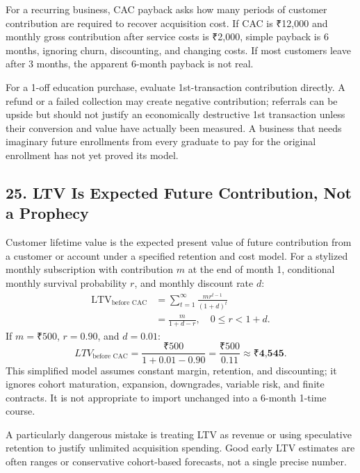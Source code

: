 For a recurring business, CAC payback asks how many periods of customer contribution are required to recover acquisition cost. If CAC is ₹12,000 and monthly gross contribution after service costs is ₹2,000, simple payback is 6 months, ignoring churn, discounting, and changing costs. If most customers leave after 3 months, the apparent 6-month payback is not real.

For a 1-off education purchase, evaluate 1st-transaction contribution directly. A refund or a failed collection may create negative contribution; referrals can be upside but should not justify an economically destructive 1st transaction unless their conversion and value have actually been measured. A business that needs imaginary future enrollments from every graduate to pay for the original enrollment has not yet proved its model.

\subsection*{25. LTV Is Expected Future Contribution, Not a Prophecy}

Customer lifetime value is the expected present value of future contribution from a customer or account under a specified retention and cost model. For a stylized monthly subscription with contribution $m$ at the end of month 1, conditional monthly survival probability $r$, and monthly discount rate $d$:
\begin{equation}
\begin{aligned}
\text{LTV}_{\text{before CAC}} &= \sum_{t=1}^{\infty} \frac{m r^{t-1}}{(1+d)^t} \\
&= \frac{m}{1 + d - r}, \quad 0 \le r < 1 + d.
\end{aligned}
\end{equation}
If $m = ₹500$, $r = 0.90$, and $d = 0.01$:
\begin{equation}
LTV_{\text{before CAC}} = \frac{₹500}{1 + 0.01 - 0.90} = \frac{₹500}{0.11} \approx \textbf{₹4,545}.
\end{equation}
This simplified model assumes constant margin, retention, and discounting; it ignores cohort maturation, expansion, downgrades, variable risk, and finite contracts. It is not appropriate to import unchanged into a 6-month 1-time course.

A particularly dangerous mistake is treating LTV as revenue or using speculative retention to justify unlimited acquisition spending. Good early LTV estimates are often ranges or conservative cohort-based forecasts, not a single precise number.

